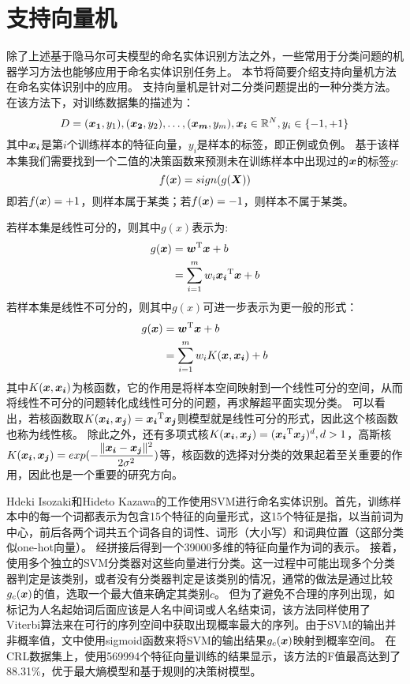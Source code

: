 \section{支持向量机}
除了上述基于隐马尔可夫模型的命名实体识别方法之外，一些常用于分类问题的机器学习方法也能够应用于命名实体识别任务上。
本节将简要介绍支持向量机方法在命名实体识别中的应用。
支持向量机是针对二分类问题提出的一种分类方法。在该方法下，对训练数据集的描述为：
\begin{equation}
    D = {(\boldsymbol{x_1}, y_1), (\boldsymbol{x_2}, y_2), \dots, (\boldsymbol{x_m}, y_m)}, \boldsymbol{x_i} \in \mathbb{R}^N, y_i \in \{-1, +1\}
\end{equation}
其中$\boldsymbol{x_i}$是第$i$个训练样本的特征向量，$y_i$是样本的标签，即正例或负例。
基于该样本集我们需要找到一个二值的决策函数来预测未在训练样本中出现过的$\boldsymbol{x}$的标签$y$:
\begin{equation}
    f(\boldsymbol{x}) = sign(g(\boldsymbol{X}))
\end{equation}
即若$f(\boldsymbol{x}) = +1$，则样本属于某类；若$f(\boldsymbol{x}) = -1$，则样本不属于某类。

若样本集是线性可分的，则其中$g(x)$表示为:
\begin{align}
    g(\boldsymbol{x}) &= \boldsymbol{w}^{\mathrm{T}}\boldsymbol{x} + b\\
    &= \sum_{i = 1}^m w_i\boldsymbol{x_i}^{\mathrm{T}}\boldsymbol{x} + b
\end{align}
若样本集是线性不可分的，则其中$g(x)$可进一步表示为更一般的形式：
\begin{align}
    g(\boldsymbol{x}) &= \boldsymbol{w}^{\mathrm{T}}\boldsymbol{x} + b\\
    &= \sum_{i = 1}^m w_i K(\boldsymbol{x}, \boldsymbol{x_i}) + b
\end{align}
其中$K(\boldsymbol{x}, \boldsymbol{x_i})$为核函数，它的作用是将样本空间映射到一个线性可分的空间，从而将线性不可分的问题转化成线性可分的问题，再求解超平面实现分类。
可以看出，若核函数取$K(\boldsymbol{x_i}, \boldsymbol{x_j}) = \boldsymbol{x_i}^{\mathrm{T}}\boldsymbol{x_j}$则模型就是线性可分的形式，因此这个核函数也称为线性核。
除此之外，还有多项式核$K(\boldsymbol{x_i}, \boldsymbol{x_j}) = (\boldsymbol{x_i}^{\mathrm{T}}\boldsymbol{x_j})^d, d>1$，高斯核$K(\boldsymbol{x_i}, \boldsymbol{x_j}) = exp(-\dfrac{\lVert\boldsymbol{x_i} - \boldsymbol{x_j}\rVert^2}{2\sigma^2})$等，核函数的选择对分类的效果起着至关重要的作用，因此也是一个重要的研究方向。

Hdeki Isozaki和Hideto Kazawa的工作使用SVM进行命名实体识别。首先，训练样本中的每一个词都表示为包含15个特征的向量形式，这15个特征是指，以当前词为中心，前后各两个词共五个词各自的词性、词形（大小写）和词典位置（这部分类似one-hot向量）。
经拼接后得到一个39000多维的特征向量作为词的表示。
接着，使用多个独立的SVM分类器对这些向量进行分类。这一过程中可能出现多个分类器判定是该类别，或者没有分类器判定是该类别的情况，通常的做法是通过比较$g_c (\boldsymbol{x})$的值，选取一个最大值来确定其类别$c$。
但为了避免不合理的序列出现，如标记为人名起始词后面应该是人名中间词或人名结束词，该方法同样使用了Viterbi算法来在可行的序列空间中获取出现概率最大的序列。由于SVM的输出并非概率值，文中使用sigmoid函数来将SVM的输出结果$g_c (\boldsymbol{x})$映射到概率空间。
在CRL数据集上，使用569994个特征向量训练的结果显示，该方法的F值最高达到了88.31\%，优于最大熵模型和基于规则的决策树模型。

